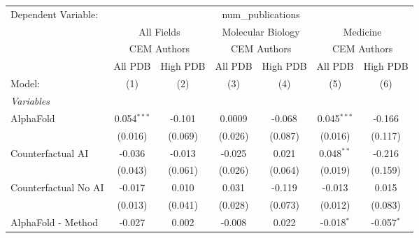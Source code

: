 \begingroup
\centering
\begin{tabular}{lcccccc}
   \tabularnewline \midrule \midrule
   Dependent Variable: & \multicolumn{6}{c}{num\_publications}\\
 & \multicolumn{2}{c}{All Fields} & \multicolumn{2}{c}{Molecular Biology} & \multicolumn{2}{c}{Medicine} \\
\cmidrule(lr){2-3} \cmidrule(lr){4-5} \cmidrule(lr){6-7}
 & \multicolumn{2}{c}{CEM Authors} & \multicolumn{2}{c}{CEM Authors} & \multicolumn{2}{c}{CEM Authors} \\
\cmidrule(lr){2-3} \cmidrule(lr){4-5} \cmidrule(lr){6-7}
 & \multicolumn{1}{c}{All PDB} & \multicolumn{1}{c}{High PDB} & \multicolumn{1}{c}{All PDB} & \multicolumn{1}{c}{High PDB} & \multicolumn{1}{c}{All PDB} & \multicolumn{1}{c}{High PDB} \\
\cmidrule(lr){2-2} \cmidrule(lr){3-3} \cmidrule(lr){4-4} \cmidrule(lr){5-5} \cmidrule(lr){6-6} \cmidrule(lr){7-7}
   Model:                                                     & (1)           & (2)           & (3)           & (4)          & (5)           & (6)\\  
   \midrule
   \emph{Variables}\\
   AlphaFold                                                  & 0.054$^{***}$ & -0.101        & 0.0009        & -0.068       & 0.045$^{***}$ & -0.166\\   
                                                              & (0.016)       & (0.069)       & (0.026)       & (0.087)      & (0.016)       & (0.117)\\   
   Counterfactual AI                                          & -0.036        & -0.013        & -0.025        & 0.021        & 0.048$^{**}$  & -0.216\\   
                                                              & (0.043)       & (0.061)       & (0.026)       & (0.064)      & (0.019)       & (0.159)\\   
   Counterfactual No AI                                       & -0.017        & 0.010         & 0.031         & -0.119       & -0.013        & 0.015\\   
                                                              & (0.013)       & (0.041)       & (0.028)       & (0.073)      & (0.012)       & (0.083)\\   
   AlphaFold - Method                                         & -0.027        & 0.002         & -0.008        & 0.022        & -0.018$^{*}$  & -0.057$^{*}$\\   

\end{tabular}
